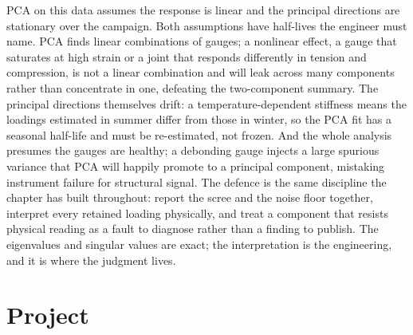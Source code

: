 PCA on this data assumes the response is linear and the principal
directions are stationary over the campaign. Both assumptions have
half-lives the engineer must name. PCA finds linear combinations of
gauges; a nonlinear effect, a gauge that saturates at high strain or a
joint that responds differently in tension and compression, is not a
linear combination and will leak across many components rather than
concentrate in one, defeating the two-component summary. The principal
directions themselves drift: a temperature-dependent stiffness means the
loadings estimated in summer differ from those in winter, so the PCA fit
has a seasonal half-life and must be re-estimated, not frozen. And the
whole analysis presumes the gauges are healthy; a debonding gauge
injects a large spurious variance that PCA will happily promote to a
principal component, mistaking instrument failure for structural signal.
The defence is the same discipline the chapter has built throughout:
report the scree and the noise floor together, interpret every retained
loading physically, and treat a component that resists physical reading
as a fault to diagnose rather than a finding to publish. The eigenvalues
and singular values are exact; the interpretation is the engineering, and
it is where the judgment lives.

\section{Project}

